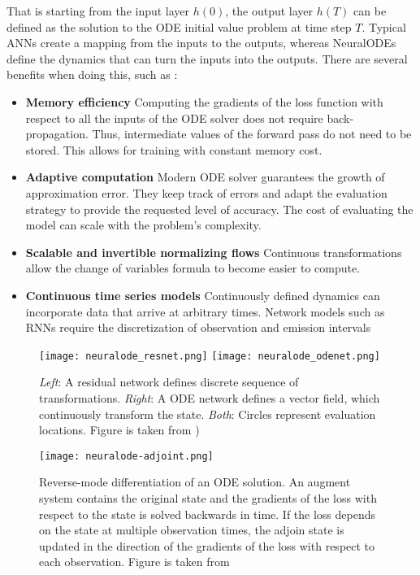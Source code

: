 That is starting from the input layer $h(0)$, the output layer $h(T)$ can be defined as the solution to the \gls{ODE} initial value problem at time step $T$.
Typical \glspl{ANN} create a mapping from the inputs to the outputs, whereas \glspl{NeuralODE} define the dynamics that can turn the inputs into the outputs.
There are several benefits when doing this, such as \cite{chenNeuralOrdinaryDifferential2019}:
\begin{itemize}
    \item \textbf{Memory efficiency}
    Computing the gradients of the loss function with respect to all the inputs of the \gls{ODE} solver does not require back-propagation.
    Thus, intermediate values of the forward pass do not need to be stored.
    This allows for training with constant memory cost.
    \item \textbf{Adaptive computation}
    Modern \gls{ODE} solver guarantees the growth of approximation error.
    They keep track of errors and adapt the evaluation strategy to provide the requested level of accuracy.
    The cost of evaluating the model can scale with the problem's complexity.
    \item \textbf{Scalable and invertible normalizing flows}
    Continuous transformations allow the change of variables formula to become easier to compute.
    \item \textbf{Continuous time series models}
    Continuously defined dynamics can incorporate data that arrive at arbitrary times.
    Network models such as \glspl{RNN} require the discretization of observation and emission intervals
\end{itemize}

\begin{figure}[h]
    \centering
    \texttt{[image: neuralode\_resnet.png]}
    \texttt{[image: neuralode\_odenet.png]}
    \caption[Comparison between NeuralODE output and normal ANN output]{\textit{Left}: A residual network defines discrete sequence of transformations. \textit{Right}: A ODE network defines a vector field, which continuously transform the state. \textit{Both}: Circles represent evaluation locations. Figure is taken from \cite{chenNeuralOrdinaryDifferential2019})}
    \label{fig:resnet-vs-odenet}
\end{figure}

\begin{figure}[h]
    \centering
    \texttt{[image: neuralode-adjoint.png]}
    \caption[Illustration of NeuralODE reverse-mode automatic differentiation]{Reverse-mode differentiation of an ODE solution. An augment system contains the original state and the gradients of the loss with respect to the state is solved backwards in time. If the loss depends on the state at multiple observation times, the adjoin state is updated in the direction of the gradients of the loss with respect to each observation. Figure is taken from \cite{chenNeuralOrdinaryDifferential2019}}
    \label{fig:neuralode-adjoint}
\end{figure}

